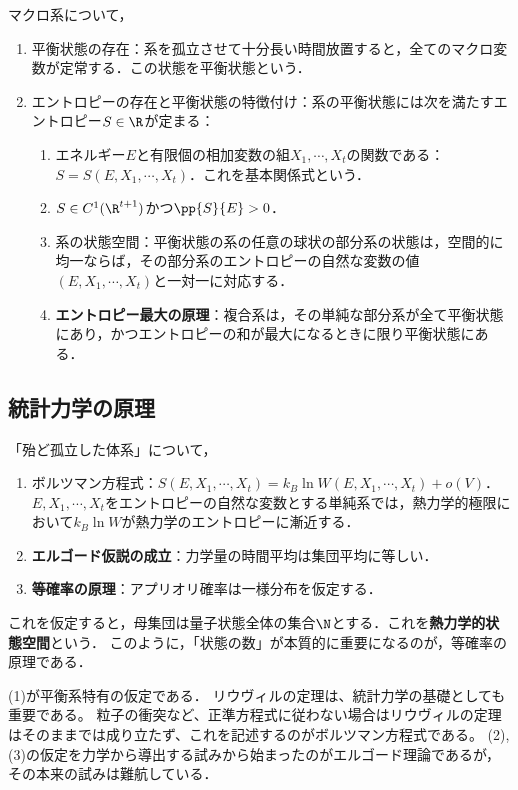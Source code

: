 \documentclass[uplatex,dvipdfmx]{jsreport}
\begin{document}
\begin{axiom}
    マクロ系について，
    \begin{enumerate}
        \item 平衡状態の存在：系を孤立させて十分長い時間放置すると，全てのマクロ変数が定常する．この状態を平衡状態という．
        \item エントロピーの存在と平衡状態の特徴付け：系の平衡状態には次を満たすエントロピー$S\in\R$が定まる：
        \begin{enumerate}
            \item エネルギー$E$と有限個の相加変数の組$X_1,\cdots,X_t$の関数である：$S=S(E,X_1,\cdots,X_t)$．これを基本関係式という．
            \item $S\in C^1(\R^{t+1})$かつ$\pp{S}{E}>0$．
            \item 系の状態空間：平衡状態の系の任意の球状の部分系の状態は，空間的に均一ならば，その部分系のエントロピーの自然な変数の値$(E,X_1,\cdots,X_t)$と一対一に対応する．
            \item \textbf{エントロピー最大の原理}：複合系は，その単純な部分系が全て平衡状態にあり，かつエントロピーの和が最大になるときに限り平衡状態にある．
        \end{enumerate}
    \end{enumerate}
\end{axiom}

\subsection{統計力学の原理}

\begin{axiom}
    「殆ど孤立した体系」について，
    \begin{enumerate}
        \item ボルツマン方程式：$S(E,X_1,\cdots,X_t)=k_B\ln W(E,X_1,\cdots,X_t)+o(V)$．$E,X_1,\cdots,X_t$をエントロピーの自然な変数とする単純系では，熱力学的極限において$k_B\ln W$が熱力学のエントロピーに漸近する．
        \item \textbf{エルゴード仮説の成立}：力学量の時間平均は集団平均に等しい．
        \item \textbf{等確率の原理}：アプリオリ確率は一様分布を仮定する．
    \end{enumerate}
    これを仮定すると，母集団は量子状態全体の集合$\N$とする．これを\textbf{熱力学的状態空間}という．
    このように，「状態の数」が本質的に重要になるのが，等確率の原理である．
\end{axiom}
\begin{remarks}
    (1)が平衡系特有の仮定である．
    リウヴィルの定理は、統計力学の基礎としても重要である。
    粒子の衝突など、正準方程式に従わない場合はリウヴィルの定理はそのままでは成り立たず、これを記述するのがボルツマン方程式である。
    (2),(3)の仮定を力学から導出する試みから始まったのがエルゴード理論であるが，
    その本来の試みは難航している．
\end{remarks}
\end{document}
